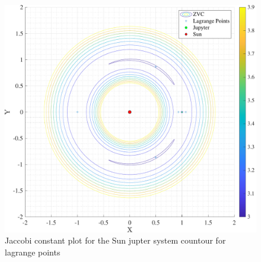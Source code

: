 \begin{figure}[H]
    \centering
    \includegraphics[width=\textwidth]{../Figure/Q1/jaccobi_2}
    \caption{Jaccobi constant plot for the Sun jupter system countour for lagrange points}
\end{figure}
